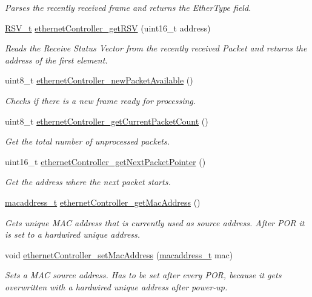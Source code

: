 \begin{DoxyCompactItemize}
\begin{DoxyCompactList}\small\item\em Parses the recently received frame and returns the Ether\+Type field. \end{DoxyCompactList}\item 
\mbox{\hyperlink{group__rsv_gaf7fd94a9424fccb0aafa846f27a43099}{R\+S\+V\+\_\+t}} \mbox{\hyperlink{group__data__reception_ga1d8cfd56b6020b891ba408c18789129c}{ethernet\+Controller\+\_\+get\+R\+SV}} (uint16\+\_\+t address)
\begin{DoxyCompactList}\small\item\em Reads the Receive Status Vector from the recently received Packet and returns the address of the first element. \end{DoxyCompactList}\item 
uint8\+\_\+t \mbox{\hyperlink{group__data__reception_gae030bd0d97a72b4c38d3ac55132dd7f3}{ethernet\+Controller\+\_\+new\+Packet\+Available}} ()
\begin{DoxyCompactList}\small\item\em Checks if there is a new frame ready for processing. \end{DoxyCompactList}\item 
uint8\+\_\+t \mbox{\hyperlink{group__data__reception_ga0ab2398cb48efd9a8943a5c5b2872b0c}{ethernet\+Controller\+\_\+get\+Current\+Packet\+Count}} ()
\begin{DoxyCompactList}\small\item\em Get the total number of unprocessed packets. \end{DoxyCompactList}\item 
uint16\+\_\+t \mbox{\hyperlink{group__data__reception_ga6155805a8511681932051b00a0032f9f}{ethernet\+Controller\+\_\+get\+Next\+Packet\+Pointer}} ()
\begin{DoxyCompactList}\small\item\em Get the address where the next packet starts. \end{DoxyCompactList}\item 
\mbox{\hyperlink{group__ethernet_gacb865bcbf50a6c8cef05581bfabff373}{macaddress\+\_\+t}} \mbox{\hyperlink{group__data__reception_gae3335ee23b52ab5086b95f83127b755c}{ethernet\+Controller\+\_\+get\+Mac\+Address}} ()
\begin{DoxyCompactList}\small\item\em Gets unique M\+AC address that is currently used as source address. After P\+OR it is set to a hardwired unique address. \end{DoxyCompactList}\item 
void \mbox{\hyperlink{group__data__reception_ga4856965b47df99d3532a7d1cbb494e02}{ethernet\+Controller\+\_\+set\+Mac\+Address}} (\mbox{\hyperlink{group__ethernet_gacb865bcbf50a6c8cef05581bfabff373}{macaddress\+\_\+t}} mac)
\begin{DoxyCompactList}\small\item\em Sets a M\+AC source address. Has to be set after every P\+OR, because it gets overwritten with a hardwired unique address after power-\/up. \end{DoxyCompactList}\end{DoxyCompactItemize}


